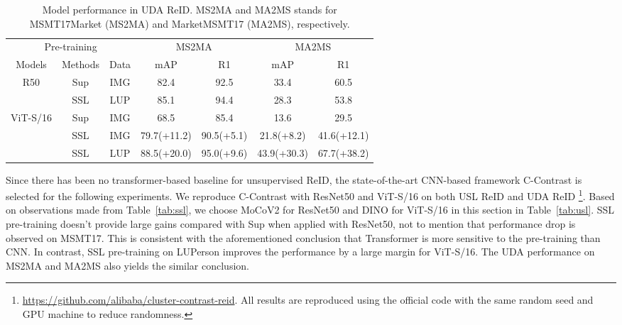 \documentclass[10pt,twocolumn,letterpaper]{article}
\begin{document}
\renewcommand{\multirowsetup}{\centering}
\begin{table}[htb]\footnotesize
    \begin{center}
    \setlength\tabcolsep{2pt}
    \begin{tabular}{ccc|cc|cc}
    \hline
     \multicolumn{3}{c|}{Pre-training}  & \multicolumn{2}{c|}{MS2MA}  & \multicolumn{2}{c}{MA2MS}\\
    Models & Methods &Data & mAP & R1 & mAP & R1\\
    \hline
    \multirow{2}{*}{R50}& Sup &IMG & 82.4 & 92.5 & 33.4 & 60.5\\
    & SSL &LUP  & 85.1 & 94.4 &28.3 &53.8\\
    \hline
    \multirow{3}{*}{ViT-S/16}& Sup &IMG & 68.5 & 85.4 & 13.6 & 29.5   \\
    & SSL &IMG &79.7{\color{gray}(+11.2)} &90.5{\color{gray}(+5.1)} &21.8{\color{gray}(+8.2)} &41.6{\color{gray}(+12.1)} \\
    & SSL &LUP &88.5{\color{gray}(+20.0)} &95.0{\color{gray}(+9.6)} &43.9{\color{gray}(+30.3)} &67.7{\color{gray}(+38.2)} \\
    \hline
    \end{tabular}
    \end{center}
    \vspace{-1em}
    \caption{\label{tab:uda} Model performance in UDA ReID. MS2MA and MA2MS stands for MSMT17Market (MS2MA) and MarketMSMT17 (MA2MS), respectively.}
    \vspace{-1em}
\end{table}


Since there has been no transformer-based baseline for unsupervised ReID, the state-of-the-art CNN-based framework C-Contrast \cite{dai2021cluster} is selected for the following experiments. We reproduce C-Contrast with ResNet50 and ViT-S/16 on both USL ReID and UDA ReID \footnote{\url{https://github.com/alibaba/cluster-contrast-reid}. All results are reproduced using the official code with the same random seed and GPU machine to reduce randomness.}. Based on observations made from Table~\ref{tab:ssl}, we choose MoCoV2 for ResNet50 and DINO for ViT-S/16 in this section in Table~\ref{tab:usl}. SSL pre-training doesn't provide large gains compared with Sup when applied with ResNet50, not to mention that performance drop is observed on MSMT17. This is consistent with the aforementioned conclusion that Transformer is more sensitive to the pre-training than CNN. In contrast, SSL pre-training on LUPerson improves the performance by a large margin for ViT-S/16. The UDA performance on MS2MA and MA2MS also yields the similar conclusion. 
\end{document}
